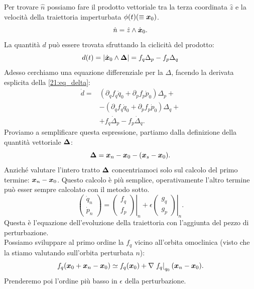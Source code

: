 Per trovare $\hat{n}$ possiamo fare il prodotto vettoriale tra la terza coordinata $\hat{z}$ e la velocità della traiettoria imperturbata $\phi (t) (\equiv \boldsymbol{x}_0)$.
\[
    \hat{n} = \hat{z} \wedge \dot{\boldsymbol{x}}_0
.\] 
La quantità $d$ può essere trovata sfruttando la ciclicità del prodotto:
\begin{equation}
    d(t) = \left| \dot{\boldsymbol{x} }_0 \wedge \boldsymbol{\Delta}\right| = f_q\Delta_p - f_p \Delta_q
    \label{21:eq_delta}
\end{equation}
Adesso cerchiamo una equazione differenziale per la $\Delta$, facendo la derivata esplicita della \ref{21:eq_delta}:
\begin{equation}
\begin{aligned}
    \dot{d} = & (\partial_{q}f_q \dot{q}_0 + \partial_{p}f_p \dot{p}_0)\Delta_p +\\
	      & - (\partial_{q}f_q \dot{q}_0 + \partial_{p}f_p \dot{p}_0)\Delta_q +\\
	      & + f_q \dot{\Delta}_p - f_p \dot{\Delta}_q
	      \label{21:eq_dotd}
.\end{aligned}
\end{equation}
Proviamo a semplificare questa espressione, partiamo dalla definizione della quantità vettoriale $\boldsymbol{\Delta}$:
\[
    \boldsymbol{\Delta}  = \boldsymbol{x}_n - \boldsymbol{x}_0 - (\boldsymbol{x}_s-\boldsymbol{x}_0)
.\] 
Anziché valutare l'intero tratto $\boldsymbol{\Delta}$ concentriamoci solo sul calcolo del primo termine: $\boldsymbol{x}_n-\boldsymbol{x}_0$. Questo calcolo è più semplice, operativamente l'altro termine può esser sempre calcolato con il metodo sotto.
\[
    \begin{pmatrix} \dot{q}_n \\ \dot{p}_n \end{pmatrix} =
    \left.\begin{pmatrix} f_q \\ f_p \end{pmatrix}\right|_{n} + \epsilon  \left.\begin{pmatrix} g_q \\ g_p \end{pmatrix}\right|_{n}  
.\] 
Questa è l'equazione dell'evoluzione della traiettoria con l'aggiunta del pezzo di perturbazione.\\
Possiamo sviluppare al primo ordine la $f_q$ vicino all'orbita omoclinica (visto che la stiamo valutando sull'orbita perturbata $n$):
\[
    f_q(\boldsymbol{x}_0 + \boldsymbol{x}_n - \boldsymbol{x}_0) \simeq f_q(\boldsymbol{x}_0) + \nabla \left.f_q\right|_{q_0}(\boldsymbol{x}_n-\boldsymbol{x}_0)
.\] 
Prenderemo poi l'ordine più basso in $\epsilon$ della perturbazione.\\

